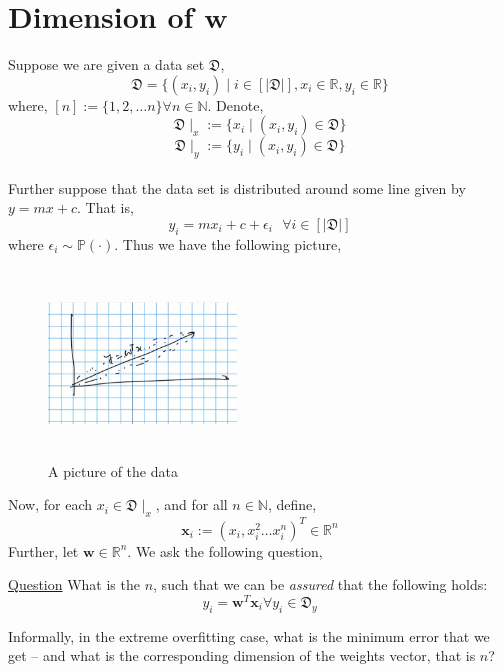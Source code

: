 \section{Dimension of $\mathbf{w}$}
Suppose we are given a data set $\mathfrak{D}$,
\[\mathfrak{D} = \{(x_i,y_i) \mid i \in [|\mathfrak{D}|], x_i \in \mathbb{R}, y_i \in \mathbb{R}\}\]
where, $[n] := \{1,2, \dots n\} \forall n \in \mathbb{N}$. Denote,
\[\mathfrak{D}\mid_x := \{x_i \mid (x_i,y_i) \in \mathfrak{D}\}\]
\[\mathfrak{D}\mid_y := \{y_i \mid (x_i,y_i) \in \mathfrak{D}\}\]
\\ 
Further suppose that the data set is distributed around some line given by $y = mx + c$.
That is, \[y_i = mx_i + c + \epsilon_i \text{ } \forall i \in [|\mathfrak{D}|]\]
where $\epsilon_i \sim \mathbb{P}(\cdot)$. Thus we have the following picture,
\begin{figure}[h]
    \centering
    \includegraphics[height = 5cm, width = 5cm]{pictures/q4.PNG}
    \caption{A picture of the data}
\end{figure}


Now, for each $x_i \in \mathfrak{D}\mid_x$, and for all $n \in \mathbb{N}$, define,
\[\mathbf{x}_i := (x_i,x_i^2 \dots x_i^n)^T \in \mathbb{R}^n\]
Further, let $\mathbf{w} \in \mathbb{R}^n$. We ask the following question,
\begin{center}
    \underline{Question} What is the $n$, such that we can be \textit{assured} that the following holds: 
    \[y_i = \mathbf{w}^T\mathbf{x}_i \forall y_i \in \mathfrak{D}_y\]
\end{center}
Informally, in the extreme overfitting case, what is the minimum error that we get -- and what is the corresponding dimension of the weights vector, that is $n$?

